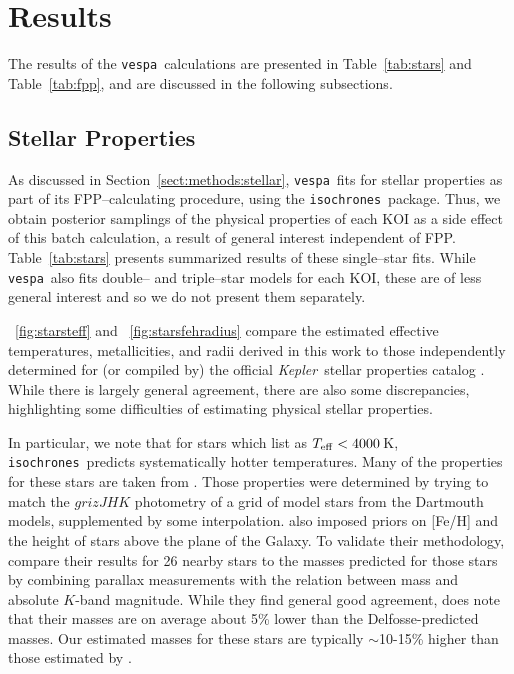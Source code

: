 \documentclass{emulateapj}
\newcommand{\figref}[1]{\ref{fig:#1}}
\newcommand{\Fig}[1]{\figurename~\figref{#1}}
\newcommand{\fig}[1]{\Fig{#1}}
\newcommand{\Tab}[1]{Table~\ref{tab:#1}}
\newcommand{\tab}[1]{\Tab{#1}}
\newcommand{\sectionname}{Section}
\newcommand{\Sect}[1]{\sectionname~\ref{sect:#1}}
\newcommand{\sect}[1]{\Sect{#1}}
\newcommand{\sectlabel}[1]{\label{sect:#1}}
\newcommand{\nattempted}{8141}
\newcommand{\ntryfail}{112}
\newcommand{\kepler}{\textit{Kepler}}
\newcommand{\vespa}{\texttt{vespa}}
\newcommand{\isochrones}{\texttt{isochrones}}
\begin{document}



\section{Results}
\sectlabel{results}

The results of the \vespa\ calculations are presented in
\tab{stars} and \tab{fpp}, and are discussed in
the following subsections.  



\subsection{Stellar Properties}
\sectlabel{results:stars}

As discussed in \sect{methods:stellar}, \vespa\ fits for stellar
properties as part of its FPP--calculating procedure, using the
\isochrones\ package.  Thus, we obtain posterior samplings of the
physical properties of each KOI as a side effect of this batch
calculation, a result of general interest independent of FPP.
\tab{stars} presents summarized results of these single--star
fits.  While \vespa\ also fits double-- and triple--star models for
each KOI, these are of less general interest and so we do not
present them separately.

\fig{starsteff} and \fig{starsfehradius} compare the estimated
effective temperatures, metallicities, and radii derived in this work
to those independently determined for (or compiled by) the official
\kepler\ stellar properties catalog \citep[][hereafter
  ]{Huber:2014}.  While there is largely
general agreement, there are also some discrepancies, highlighting some
difficulties of estimating physical stellar properties.

In particular, we note that for stars which 
list as $T_{\rm eff} < 4000$\,K, \isochrones\ predicts systematically
hotter temperatures.  Many of the  properties
for these stars are taken from
\citet[][]{Dressing:2013}.  Those properties
were determined by trying to match the $grizJHK$ photometry
of a grid of model stars from the Dartmouth models, supplemented by
some interpolation.   also imposed priors
on [Fe/H] and the height of stars above the plane of the Galaxy.  To
validate their methodology,  compare their
results for 26 nearby stars to the masses predicted for those stars by
combining parallax measurements with the \citet{Delfosse:2000}
relation between mass and absolute $K$-band magnitude.  While they
find general good agreement,  does note that
their masses are on average about 5\% lower than the Delfosse-predicted
masses.  Our estimated masses for these stars are typically
$\sim$10-15\% higher than those estimated by .
\end{document}
